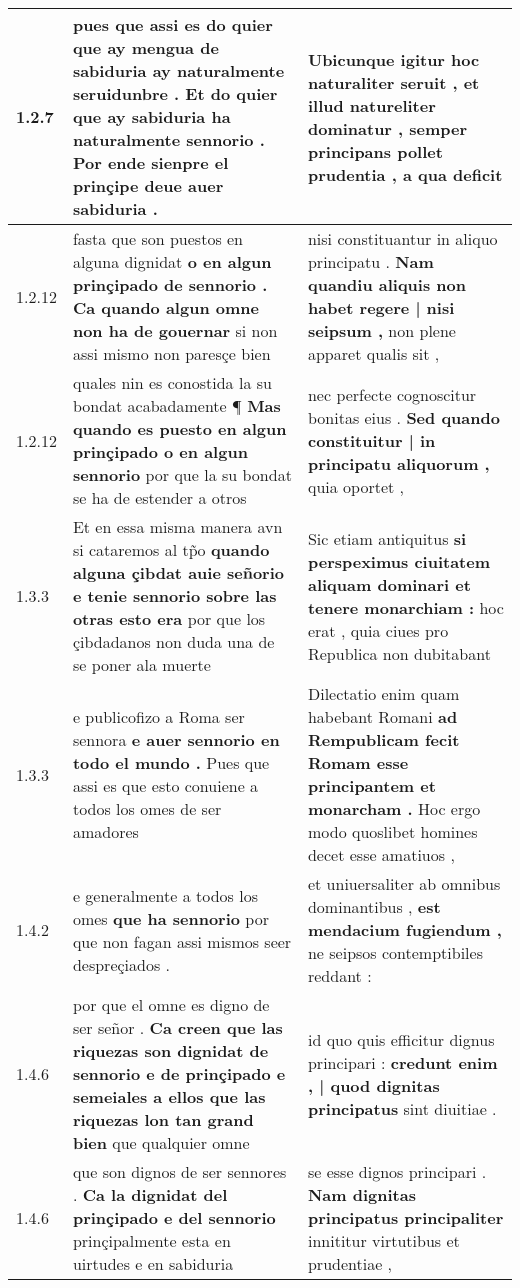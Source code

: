 \begin{tabular}{|p{1cm}|p{6.5cm}|p{6.5cm}|}
1.2.7 & pues que assi es do quier que ay mengua de sabiduria ay naturalmente seruidunbre . \textbf{ Et do quier que ay sabiduria ha naturalmente sennorio . } Por ende sienpre el prinçipe deue auer sabiduria . & Ubicunque igitur hoc naturaliter seruit , \textbf{ et illud natureliter dominatur , } semper principans pollet prudentia , a qua deficit \\\hline
1.2.12 & fasta que son puestos en alguna dignidat \textbf{ o en algun prinçipado de sennorio . Ca quando algun omne non ha de gouernar } si non assi mismo non paresçe bien & nisi constituantur in aliquo principatu . \textbf{ Nam quandiu aliquis non habet regere | nisi seipsum , } non plene apparet qualis sit , \\\hline
1.2.12 & quales nin es conostida la su bondat acabadamente ¶ \textbf{ Mas quando es puesto en algun prinçipado o en algun sennorio } por que la su bondat se ha de estender a otros & nec perfecte cognoscitur bonitas eius . \textbf{ Sed quando constituitur | in principatu aliquorum , } quia oportet , \\\hline
1.3.3 & Et en essa misma manera avn si cataremos al tp̃o \textbf{ quando alguna çibdat auie señorio e tenie sennorio sobre las otras esto era } por que los çibdadanos non duda una de se poner ala muerte & Sic etiam antiquitus \textbf{ si perspeximus ciuitatem aliquam dominari et tenere monarchiam : } hoc erat , quia ciues pro Republica non dubitabant \\\hline
1.3.3 & e publicofizo a Roma ser sennora \textbf{ e auer sennorio en todo el mundo . } Pues que assi es que esto conuiene a todos los omes de ser amadores & Dilectatio enim quam habebant Romani \textbf{ ad Rempublicam fecit Romam esse principantem et monarcham . } Hoc ergo modo quoslibet homines decet esse amatiuos , \\\hline
1.4.2 & e generalmente a todos los omes \textbf{ que ha sennorio } por que non fagan assi mismos seer despreçiados . & et uniuersaliter ab omnibus dominantibus , \textbf{ est mendacium fugiendum , } ne seipsos contemptibiles reddant : \\\hline
1.4.6 & por que el omne es digno de ser señor . \textbf{ Ca creen que las riquezas son dignidat de sennorio e de prinçipado e semeiales a ellos que las riquezas lon tan grand bien } que qualquier omne & id quo quis efficitur dignus principari : \textbf{ credunt enim , | quod dignitas principatus } sint diuitiae . \\\hline
1.4.6 & que son dignos de ser sennores . \textbf{ Ca la dignidat del prinçipado e del sennorio } prinçipalmente esta en uirtudes e en sabiduria & se esse dignos principari . \textbf{ Nam dignitas principatus principaliter } innititur virtutibus et prudentiae , \\\hline

\end{tabular}

